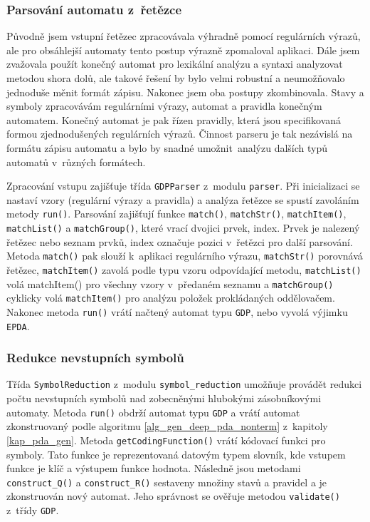 \subsubsection{Parsování automatu z~řetězce}

Původně jsem vstupní řetězec zpracovávala výhradně pomocí regulárních výrazů, ale pro obsáhlejší automaty tento postup výrazně zpomaloval aplikaci. Dále jsem zvažovala použít konečný automat pro lexikální analýzu a syntaxi analyzovat metodou shora dolů, ale takové řešení by bylo velmi robustní a neumožňovalo jednoduše měnit formát zápisu. Nakonec jsem oba postupy zkombinovala. Stavy a symboly zpracovávám regulárními výrazy, automat a pravidla konečným automatem. Konečný automat je pak řízen pravidly, která jsou specifikovaná formou zjednodušených regulárních výrazů. Činnost parseru je tak nezávislá na formátu zápisu automatu a bylo by snadné umožnit~analýzu dalších typů automatů v~různých formátech.

Zpracování vstupu zajišťuje třída \texttt{GDPParser} z~modulu \texttt{parser}. 
Při inicializaci se nastaví vzory (regulární výrazy a pravidla) a analýza řetězce se spustí zavoláním metody \texttt{run()}. Parsování zajišťují funkce \texttt{match()}, \texttt{matchStr()}, \texttt{matchItem()}, \texttt{matchList()} a \texttt{matchGroup()}, které vrací dvojici prvek, index. Prvek je nalezený řetězec nebo seznam prvků, index označuje pozici v~řetězci pro další parsování. Metoda \texttt{match()} pak slouží k~aplikaci regulárního výrazu, \texttt{matchStr()} porovnává řetězec, \texttt{matchItem()} zavolá podle typu vzoru odpovídající metodu, \texttt{matchList()} volá matchItem() pro všechny vzory v~předaném seznamu a \texttt{matchGroup()} cyklicky volá \texttt{matchItem()} pro analýzu položek prokládaných oddělovačem. Nakonec metoda \texttt{run()} vrátí načtený automat typu \texttt{GDP}, nebo vyvolá výjimku \texttt{EPDA}.

\subsubsection{Redukce nevstupních symbolů}

Třída \texttt{SymbolReduction} z~modulu \texttt{symbol\_reduction} umožňuje provádět redukci počtu nevstupních symbolů nad zobecněnými hlubokými zásobníkovými automaty. Metoda \texttt{run()} obdrží automat typu \texttt{GDP} a vrátí automat zkonstruovaný podle algoritmu \ref{alg_gen_deep_pda_nonterm} z~kapitoly \ref{kap_pda_gen}.
Metoda \texttt{getCodingFunction()} vrátí kódovací funkci pro symboly. Tato funkce je reprezentovaná datovým typem slovník, kde vstupem funkce je klíč a výstupem funkce hodnota. Následně jsou metodami \texttt{construct\_Q()} a \texttt{construct\_R()} sestaveny množiny stavů a pravidel a je zkonstruován nový automat. Jeho správnost se ověřuje metodou \texttt{validate()} z~třídy \texttt{GDP}.

